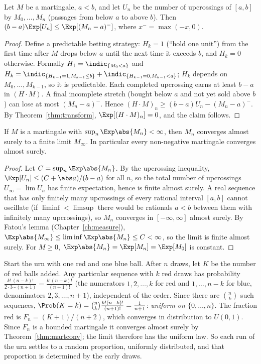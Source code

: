 \begin{theorem}\label{thm:upcross}
Let $M$ be a martingale, $a<b$, and let $U_n$ be the number of upcrossings of $[a,b]$ by
$M_0,\dots,M_n$ (passages from below $a$ to above $b$). Then
$(b-a)\Exp[U_n]\le\Exp[(M_n-a)^-]$, where $x^-=\max(-x,0)$.
\end{theorem}
\begin{proof}
Define a predictable betting strategy: $H_k=1$ (``hold one unit'') from the first time after
$M$ drops below $a$ until the next time it exceeds $b$, and $H_k=0$ otherwise. Formally
$H_1=\indic_{\{M_0<a\}}$ and $H_k=\indic_{\{H_{k-1}=1,M_{k-1}\le b\}}+\indic_{\{H_{k-1}=0,M_{k-1}<a\}}$;
$H_k$ depends on $M_0,\dots,M_{k-1}$, so it is predictable. Each completed upcrossing earns at
least $b-a$ in $(H\cdot M)$. A final incomplete stretch (bought below $a$ and not yet sold
above $b$) can lose at most $(M_n-a)^-$. Hence
$(H\cdot M)_n\ge(b-a)U_n-(M_n-a)^-$. By Theorem~\ref{thm:transform},
$\Exp[(H\cdot M)_n]=0$, and the claim follows.
\end{proof}

\begin{theorem}\label{thm:martconv}
If $M$ is a martingale with $\sup_n\Exp\abs{M_n}<\infty$, then $M_n$ converges almost surely
to a finite limit $M_\infty$. In particular every non-negative martingale converges almost
surely.
\end{theorem}
\begin{proof}
Let $C=\sup_n\Exp\abs{M_n}$. By the upcrossing inequality,
$\Exp[U_n]\le(C+\abs a)/(b-a)$ for all $n$, so the total number of upcrossings
$U_\infty=\lim U_n$ has finite expectation, hence is finite almost surely. A real sequence
that has only finitely many upcrossings of every rational interval $[a,b]$ cannot oscillate
(if $\liminf<\limsup$ there would be rationals $a<b$ between them with infinitely many
upcrossings), so $M_n$ converges in $[-\infty,\infty]$ almost surely. By Fatou's lemma
(Chapter~\ref{ch:measure}), $\Exp\abs{M_\infty}\le\liminf\Exp\abs{M_n}\le C<\infty$, so the limit
is finite almost surely. For $M\ge0$, $\Exp\abs{M_n}=\Exp[M_n]=\Exp[M_0]$ is constant.
\end{proof}

\begin{example}\label{ex:polya}
Start the urn with one red and one blue ball. After $n$ draws, let $K$ be the number of red
balls added. Any particular sequence with $k$ red draws has probability
$\frac{k!\,(n-k)!}{2\cdot3\cdots(n+1)}=\frac{k!(n-k)!}{(n+1)!}$ (the numerators $1,2,\dots,k$ for
red and $1,\dots,n-k$ for blue, denominators $2,3,\dots,n+1$), independent of the order. Since
there are $\binom nk$ such sequences, $\Prob(K=k)=\binom nk\frac{k!(n-k)!}{(n+1)!}=\frac1{n+1}$:
\emph{uniform on $\{0,\dots,n\}$}. The fraction red is $F_n=(K+1)/(n+2)$, which converges in
distribution to $U(0,1)$. Since $F_n$ is a bounded martingale it converges almost surely by
Theorem~\ref{thm:martconv}; the limit therefore has the uniform law. So each run of the urn
settles to a random proportion, uniformly distributed, and that proportion is determined by
the early draws.
\end{example}

